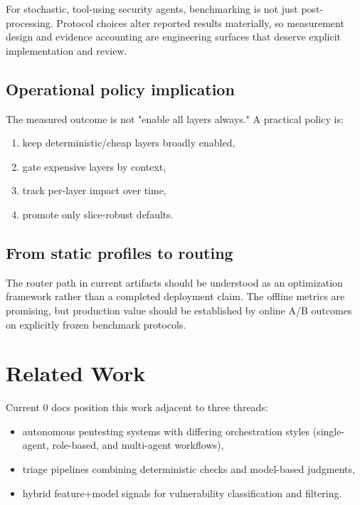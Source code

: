 \documentclass[11pt]{article}
\begin{document}
For stochastic, tool-using security agents, benchmarking is not just
post-processing. Protocol choices alter reported results materially, so
measurement design and evidence accounting are engineering surfaces that deserve
explicit implementation and review.

\subsection{Operational policy implication}

The measured outcome is not "enable all layers always." A practical policy is:

\begin{enumerate}[leftmargin=*]
  \item keep deterministic/cheap layers broadly enabled,
  \item gate expensive layers by context,
  \item track per-layer impact over time,
  \item promote only slice-robust defaults.
\end{enumerate}

\subsection{From static profiles to routing}

The router path in current artifacts should be understood as an optimization
framework rather than a completed deployment claim. The offline metrics are
promising, but production value should be established by online A/B outcomes on
explicitly frozen benchmark protocols.

\section{Related Work}

Current 0 docs position this work adjacent to three threads:

\begin{itemize}
  \item autonomous pentesting systems with differing orchestration styles
  (single-agent, role-based, and multi-agent workflows),
  \item triage pipelines combining deterministic checks and model-based
  judgments,
  \item hybrid feature+model signals for vulnerability classification and
  filtering.
\end{itemize}
\end{document}
